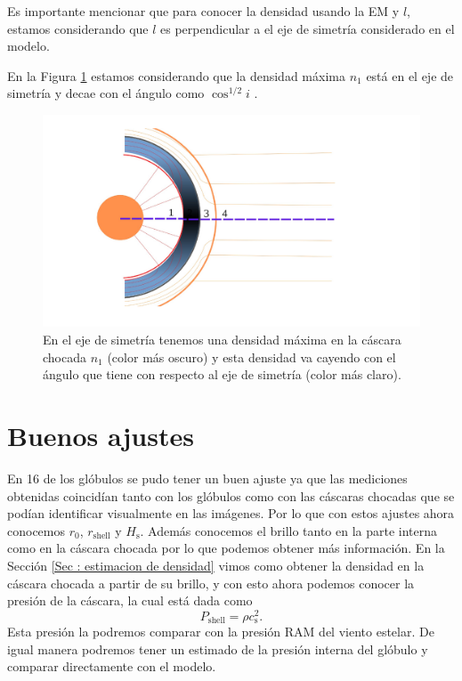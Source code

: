 \documentclass{book}
\begin{document}
Es importante mencionar que  para conocer la densidad usando la EM y $l$, estamos considerando que $l$ es perpendicular a el eje de simetría considerado en el modelo. 

En la Figura \ref{fig:dens_angl} estamos considerando que la densidad máxima $n_1$ está en el eje de simetría y decae  con el ángulo como $\cos^{1/2} i$ \citep{Tarango:2018}.

\begin{figure}[htb]
    \centering    \includegraphics[width=\textwidth]{Nuevas imagenes finales/densi_angle.pdf}
    \caption{En el eje de simetría tenemos una densidad máxima en la cáscara chocada $n_1$ (color más oscuro) y esta densidad va cayendo con el ángulo que tiene con respecto al eje de simetría (color más claro).}
    \label{fig:dens_angl}
\end{figure}


\section{Buenos ajustes}\label{Good results}

En 16 de los glóbulos se pudo tener un buen ajuste ya que las mediciones obtenidas coincidían tanto con los glóbulos como con las cáscaras chocadas que se podían identificar visualmente en las imágenes. Por lo que con estos ajustes ahora conocemos $r_0$, $r_\mathrm{shell}$ y $H_\mathrm{s}$. Además conocemos el brillo tanto en la parte interna como en la cáscara chocada por lo que podemos obtener más información. En la Sección \ref{Sec : estimacion de densidad} vimos como obtener la densidad en la cáscara chocada a partir de su brillo, y con esto ahora podemos conocer la presión de la cáscara, la cual está dada  como 
\begin{equation}
    P_\mathrm{shell}=\rho c_\mathrm{s}^2.
\end{equation}
 Esta presión la podremos comparar con la presión RAM del viento estelar. De igual manera podremos tener un estimado de la presión interna del glóbulo y comparar directamente con el modelo.
\end{document}
